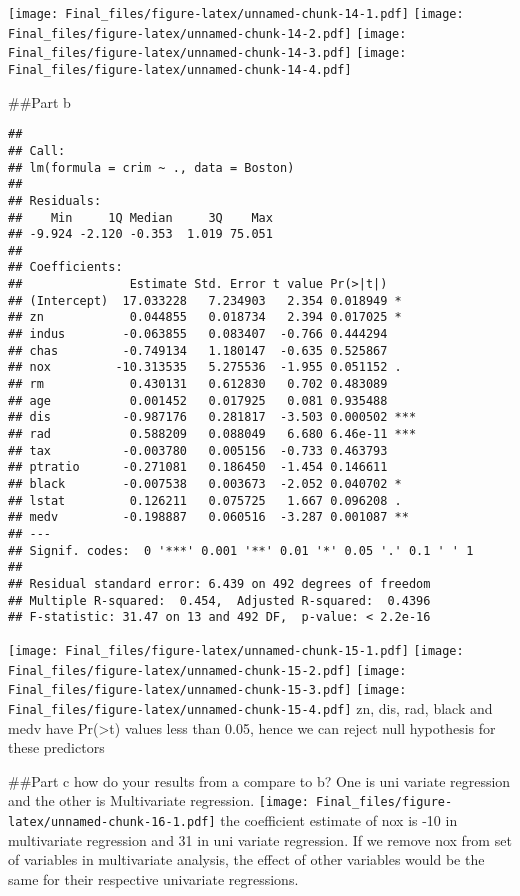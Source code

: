 \documentclass[
]{article}
\begin{document}
\texttt{[image: Final\_files/figure-latex/unnamed-chunk-14-1.pdf]}
\texttt{[image: Final\_files/figure-latex/unnamed-chunk-14-2.pdf]}
\texttt{[image: Final\_files/figure-latex/unnamed-chunk-14-3.pdf]}
\texttt{[image: Final\_files/figure-latex/unnamed-chunk-14-4.pdf]}

\#\#Part b

\begin{verbatim}
## 
## Call:
## lm(formula = crim ~ ., data = Boston)
## 
## Residuals:
##    Min     1Q Median     3Q    Max 
## -9.924 -2.120 -0.353  1.019 75.051 
## 
## Coefficients:
##               Estimate Std. Error t value Pr(>|t|)    
## (Intercept)  17.033228   7.234903   2.354 0.018949 *  
## zn            0.044855   0.018734   2.394 0.017025 *  
## indus        -0.063855   0.083407  -0.766 0.444294    
## chas         -0.749134   1.180147  -0.635 0.525867    
## nox         -10.313535   5.275536  -1.955 0.051152 .  
## rm            0.430131   0.612830   0.702 0.483089    
## age           0.001452   0.017925   0.081 0.935488    
## dis          -0.987176   0.281817  -3.503 0.000502 ***
## rad           0.588209   0.088049   6.680 6.46e-11 ***
## tax          -0.003780   0.005156  -0.733 0.463793    
## ptratio      -0.271081   0.186450  -1.454 0.146611    
## black        -0.007538   0.003673  -2.052 0.040702 *  
## lstat         0.126211   0.075725   1.667 0.096208 .  
## medv         -0.198887   0.060516  -3.287 0.001087 ** 
## ---
## Signif. codes:  0 '***' 0.001 '**' 0.01 '*' 0.05 '.' 0.1 ' ' 1
## 
## Residual standard error: 6.439 on 492 degrees of freedom
## Multiple R-squared:  0.454,  Adjusted R-squared:  0.4396 
## F-statistic: 31.47 on 13 and 492 DF,  p-value: < 2.2e-16
\end{verbatim}

\texttt{[image: Final\_files/figure-latex/unnamed-chunk-15-1.pdf]}
\texttt{[image: Final\_files/figure-latex/unnamed-chunk-15-2.pdf]}
\texttt{[image: Final\_files/figure-latex/unnamed-chunk-15-3.pdf]}
\texttt{[image: Final\_files/figure-latex/unnamed-chunk-15-4.pdf]} zn,
dis, rad, black and medv have Pr(\textgreater\textbar t\textbar) values
less than 0.05, hence we can reject null hypothesis for these predictors

\#\#Part c how do your results from a compare to b? One is uni variate
regression and the other is Multivariate regression.
\texttt{[image: Final\_files/figure-latex/unnamed-chunk-16-1.pdf]} the
coefficient estimate of nox is -10 in multivariate regression and 31 in
uni variate regression. If we remove nox from set of variables in
multivariate analysis, the effect of other variables would be the same
for their respective univariate regressions.
\end{document}
